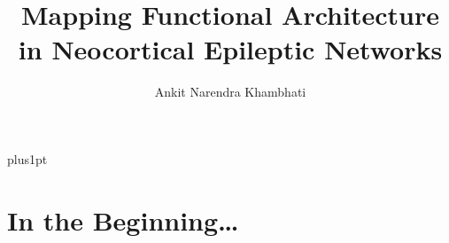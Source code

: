 \documentclass[11pt, openany, oneside]{Latex/Classes/PhDthesisPSnPDF}
\title{Mapping Functional Architecture in Neocortical Epileptic Networks} %
\author{Ankit Narendra Khambhati}
\begin{document}
\renewcommand\baselinestretch{1.2}
\baselineskip=18pt plus1pt


\maketitle  

\makecopyright  







\setcounter{secnumdepth}{3} %
\setcounter{tocdepth}{3}    %
\tableofcontents            %


\listoftables  %

\listoffigures	





\mainmatter

	

\part{In the Beginning\ldots}
\end{document}
